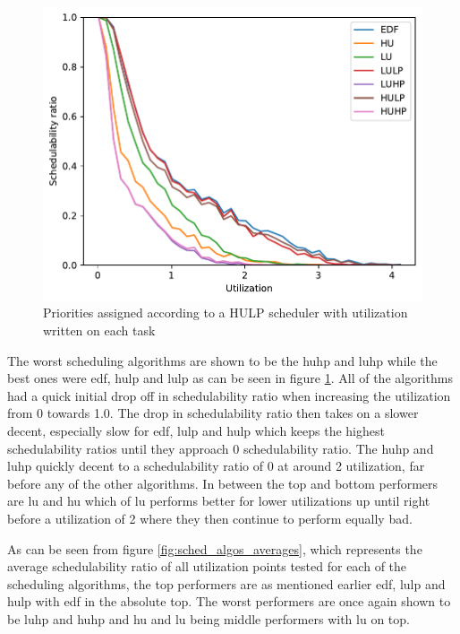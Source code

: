 \documentclass{kththesis}
\begin{document}
\begin{figure}[H]

    \centering

    \includegraphics[width=1.0\linewidth]{images/sched_algos.pdf}

    \caption{Priorities assigned according to a HULP scheduler with utilization written on each task}

    \label{fig:sched_algos}

\end{figure}

The worst scheduling algorithms are shown to be the \acrshort{huhp} and \acrshort{luhp} while the
best ones were \acrshort{edf}, \acrshort{hulp} and \acrshort{lulp} as can be seen in figure
\ref{fig:sched_algos}. All of the algorithms had a quick initial drop off in schedulability ratio
when increasing the utilization from 0 towards 1.0. The drop in schedulability ratio then takes on a
slower decent, especially slow for \acrshort{edf}, \acrshort{lulp} and \acrshort{hulp} which keeps
the highest schedulability ratios until they approach 0 schedulability ratio. The \acrshort{huhp}
and \acrshort{luhp} quickly decent to a schedulability ratio of 0 at around 2 utilization, far
before any of the other algorithms. In between the top and bottom performers are \acrshort{lu} and
\acrshort{hu} which of \acrshort{lu} performs better for lower utilizations up until right before a
utilization of 2 where they then continue to perform equally bad.

As can be seen from figure \ref{fig:sched_algos_averages}, which represents the average
schedulability ratio of all utilization points tested for each of the scheduling algorithms, the top
performers are as mentioned earlier \acrshort{edf}, \acrshort{lulp} and \acrshort{hulp} with
\acrshort{edf} in the absolute top. The worst performers are once again shown to be \acrshort{luhp}
and \acrshort{huhp} and \acrshort{hu} and \acrshort{lu} being middle performers with \acrshort{lu}
on top.
\end{document}
